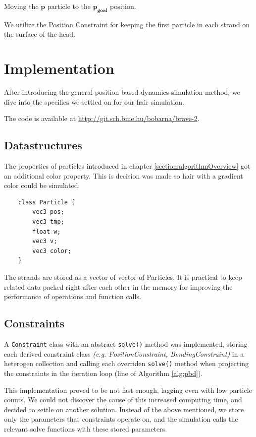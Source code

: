 \documentclass[sigplan,screen,nonacm]{acmart}
\renewcommand{\b}{\boldsymbol}
\begin{document}
Moving the $\b{p}$ particle to the $\b{p_{goal}}$ position.

We utilize the Position Constraint for keeping the first particle in each strand
on the surface of the head.


\section{Implementation}
After introducing the general position based dynamics simulation method, we dive
into the specifics we settled on for our hair simulation.

The code is available at \url{http://git.sch.bme.hu/bobarna/brave-2}.

\subsection{Datastructures}

The properties of particles introduced in chapter
\ref{section:algorithmOverview}
 got an additional color property. This is
decision was made so hair with a gradient color could be simulated.

\begin{verbatim}
    class Particle {
        vec3 pos;
        vec3 tmp;
        float w;
        vec3 v;
        vec3 color;
    }
\end{verbatim}

The strands are stored as a vector of vector of Particles. It is practical to
keep related data packed right after each other in the memory for improving the
performance of operations and function calls.


\subsection{Constraints}
A \texttt{Constraint} class with an abstract \texttt{solve()} method was
implemented, storing each derived constraint class \emph{(e.g.
PositionConstraint, BendingConstraint)} in a heterogen
collection and calling each overriden \texttt{solve()} method when projecting
the constraints in the iteration loop (line  of Algorithm
\ref{alg:pbd}).

This implementation proved to be not fast enough, lagging even with low particle
counts. We could not discover the cause of this increased computing time, and
decided to settle on another solution. Instead of the above mentioned, we
store only the parameters that constraints operate on, and the simulation calls
the relevant solve functions with these stored parameters.
\end{document}
